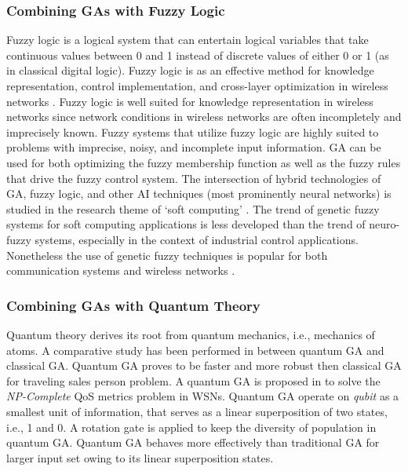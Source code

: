 \documentclass[journal]{IEEEtran}
\begin{document}
\vspace{2mm}
\subsubsection{Combining GAs with Fuzzy Logic}

Fuzzy logic is a logical system that can entertain logical variables that take continuous values between 0 and 1 instead of discrete values of either 0 or 1 (as in classical digital logic). Fuzzy logic is as an effective method for knowledge representation, control implementation, and cross-layer optimization in wireless networks \cite{baldo2008fuzzy}. Fuzzy logic is well suited for knowledge representation in wireless networks since network conditions in wireless networks are often incompletely and imprecisely known. Fuzzy systems that utilize fuzzy logic are highly suited to problems with imprecise, noisy, and incomplete input information. GA can be used for both optimizing the fuzzy membership function as well as the fuzzy rules that drive the fuzzy control system.  The intersection of hybrid technologies of GA, fuzzy logic, and other AI techniques (most prominently neural networks) is studied in the research theme of `soft computing' \cite{zadeh1994fuzzy}.  The trend of genetic fuzzy systems for soft computing applications is less developed than the trend of neuro-fuzzy systems, especially in the context of industrial control applications. Nonetheless the use of genetic fuzzy techniques is popular for both communication systems \cite{wang2003soft} and wireless networks \cite{yun2009soft}. 



\vspace{2mm}
\subsubsection{Combining GAs with Quantum Theory}

Quantum theory derives its root from quantum mechanics, i.e., mechanics of atoms. A comparative study has been performed in \cite{narayanan1996quantum} between quantum GA and classical GA. Quantum GA proves to be faster and more robust then classical GA for traveling sales person problem. A quantum GA is proposed in \cite{luo2010quantum} to solve the \emph{NP-Complete} QoS metrics problem in WSNs. Quantum GA operate on \emph{qubit} as a smallest unit of information, that serves as a linear superposition of two states, i.e., 1 and 0. A rotation gate is applied to keep the diversity of population in quantum GA. Quantum GA behaves more effectively than traditional GA for larger input set owing to its linear superposition states.
\end{document}
